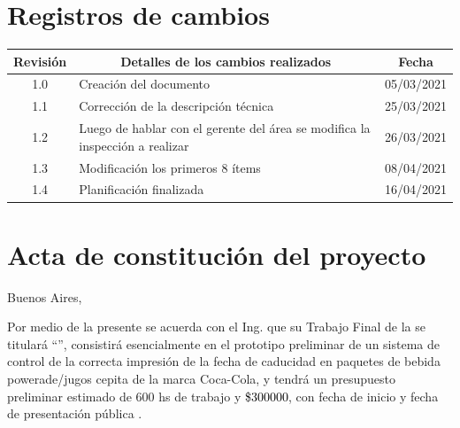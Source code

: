 \documentclass[11pt]{charter}
\begin{document}
\maketitle
\thispagestyle{empty}
\pagebreak


\thispagestyle{empty}
{\setlength{\parskip}{0pt}
\tableofcontents{}
}
\pagebreak


\section{Registros de cambios}
\label{sec:registro}


\begin{table}[ht]
\label{tab:registro}
\centering
\begin{tabularx}{\linewidth}{@{}|c|X|c|@{}}
\hline
\rowcolor[HTML]{C0C0C0} 
Revisión & \multicolumn{1}{c|}{\cellcolor[HTML]{C0C0C0}Detalles de los cambios realizados} & Fecha      \\ \hline
1.0      & Creación del documento                                          & 05/03/2021\\ \hline
1.1      & Corrección de la descripción técnica                                     
& 25/03/2021 \\ \hline
1.2      & Luego de hablar con el gerente del área se modifica la inspección\newline
a realizar
& 26/03/2021 \\ \hline
1.3		 & Modificación los primeros 8 ítems  
& 08/04/2021 \\ \hline
1.4		 & Planificación finalizada 
& 16/04/2021 \\ \hline

\end{tabularx}
\end{table}

\pagebreak



\section{Acta de constitución del proyecto}
\label{sec:acta}

\begin{flushright}
Buenos Aires, \fechaInicioName
\end{flushright}

\vspace{2cm}

Por medio de la presente se acuerda con el Ing. \authorname\hspace{1px} que su Trabajo Final de la \degreename\hspace{1px} se titulará ``\ttitle'', consistirá esencialmente en el prototipo preliminar de un sistema de control de la correcta impresión de la fecha de caducidad en paquetes de bebida powerade/jugos cepita de la marca Coca-Cola, y tendrá un presupuesto preliminar estimado de 600 hs de trabajo y \textcolor{black}{\$300000}, con fecha de inicio \fechaInicioName\hspace{1px} y fecha de presentación pública \fechaFinalName.
\end{document}

